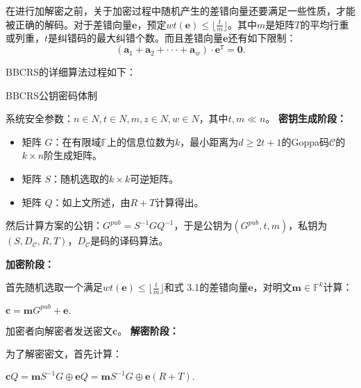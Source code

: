 在进行加解密之前，关于加密过程中随机产生的差错向量还要满足一些性质，才能被正确的解码。对于差错向量$\mathbf{e}$，预定$wt(\mathbf{e}) \leq \lfloor \frac{t}{m} \rfloor$。其中$m$是矩阵$T$的平均行重或列重，$t$是纠错码的最大纠错个数。而且差错向量$\mathbf{e}$还有如下限制：
\begin{equation}
	(\mathbf{a}_1 + \mathbf{a}_2 + ··· + \mathbf{a}_w) \cdot \mathbf{e}^\mathtt{T} = \mathbf{0}.
\end{equation}

\begin{flushleft}
	BBCRS的详细算法过程如下：
\end{flushleft}
\begin{breakablealgorithm}
	\small
	\renewcommand{\algorithmicrequire}{\textbf{Input:}}
	\renewcommand{\algorithmicensure}{\textbf{Output:}}
	\caption{BBCRS公钥密码体制}
	\label{alg:BBCRS}
	\begin{algorithmic}	
		\State
		系统安全参数：$n \in N, t \in N, m, z \in N, w \in N$，其中$t,m \ll n$。
		\State
		\textbf{密钥生成阶段：}
		
		\begin{itemize}
			\item 矩阵 $G$：在有限域$\mathbb{F}$上的信息位数为$k$，最小距离为$d \geq 2t + 1$的Goppa码$\mathcal{C}$的$k \times n$阶生成矩阵。
			\item 矩阵 $S$：随机选取的$k \times k$可逆矩阵。
			\item 矩阵 $Q$：如上文所述，由$R + T$计算得出。
		\end{itemize}
		
		然后计算方案的公钥：$G^{pub} = S^{-1}GQ^{-1}$，于是公钥为$(G^{pub}, t, m)$，私钥为$(S,D_\mathcal{C},R,T)$，$D_\mathcal{C}$是码的译码算法。
		
		\State
		\textbf{加密阶段：}
		
		首先随机选取一个满足$wt(\mathbf{e}) \leq \lfloor \frac{t}{m} \rfloor$和式 3.1的差错向量$\mathbf{e}$，对明文$\mathbf{m} \in \mathbb{F}^k$计算：
		
		\begin{center}
			$\mathbf{c} = \mathbf{m}G^{pub} + \mathbf{e}.$
		\end{center}
		
		加密者向解密者发送密文$\mathbf{c}$。
		\State
		\textbf{解密阶段：}
		
		为了解密密文，首先计算：
		\begin{center}
			$\mathbf{c}Q = \mathbf{m}S^{-1}G \oplus\mathbf{e}Q = \mathbf{m}S^{-1}G \oplus\mathbf{e}(R + T).$
		\end{center}
		

\end{algorithmic}
\end{breakablealgorithm}
